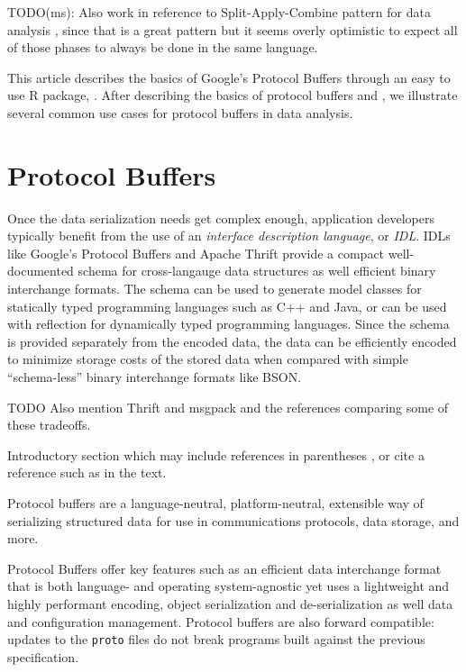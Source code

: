 TODO(ms): Also work in reference to Split-Apply-Combine pattern for
data analysis \citep{wickham2011split}, since that is a great pattern
but it seems overly optimistic to expect all of those phases to always
be done in the same language.

This article describes the basics of Google's Protocol Buffers through
an easy to use R package, .  After describing the
basics of protocol buffers and , we illustrate
several common use cases for protocol buffers in data analysis.

\section{Protocol Buffers}

Once the data serialization needs get complex enough, application
developers typically benefit from the use of an \emph{interface
description language}, or \emph{IDL}.  IDLs like Google's Protocol
Buffers and Apache Thrift provide a compact well-documented schema for
cross-langauge data structures as well efficient binary interchange
formats.  The schema can be used to generate model classes for
statically typed programming languages such as C++ and Java, or can be
used with reflection for dynamically typed programming languages.
Since the schema is provided separately from the encoded data, the
data can be efficiently encoded to minimize storage costs of the
stored data when compared with simple ``schema-less'' binary
interchange formats like BSON.



TODO Also mention Thrift and msgpack and the references comparing some
of these tradeoffs.

Introductory section which may include references in parentheses
\citep{R}, or cite a reference such as \citet{R} in the text.

Protocol buffers are a language-neutral, platform-neutral, extensible
way of serializing structured data for use in communications
protocols, data storage, and more.

Protocol Buffers offer key features such as an efficient data interchange
format that is both language- and operating system-agnostic yet uses a
lightweight and highly performant encoding, object serialization and
de-serialization as well data and configuration management. Protocol
buffers are also forward compatible: updates to the \texttt{proto}
files do not break programs built against the previous specification.

